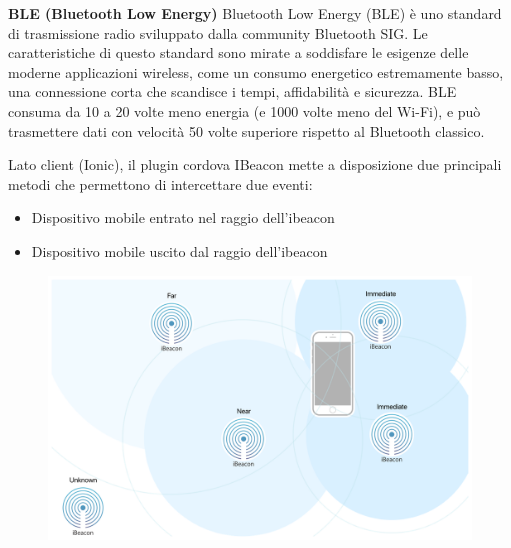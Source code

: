 \textbf{BLE (Bluetooth Low Energy)}
Bluetooth Low Energy (BLE) è uno standard di trasmissione radio sviluppato dalla community 
Bluetooth SIG. Le caratteristiche di questo standard sono mirate a soddisfare le esigenze
delle moderne applicazioni wireless, come un consumo energetico estremamente basso, una
connessione corta che scandisce i tempi, affidabilità e sicurezza. 
BLE consuma da 10 a 20 volte meno energia (e 1000 volte meno del Wi-Fi), e può trasmettere
dati con velocità 50 volte superiore rispetto al Bluetooth classico. 

Lato client (Ionic), il plugin cordova IBeacon mette a disposizione due principali metodi
che permettono di intercettare due eventi:

\begin{itemize}
    \item Dispositivo mobile entrato nel raggio dell'ibeacon
    \item Dispositivo mobile uscito dal raggio dell'ibeacon
\end{itemize}

\begin{figure}[H]
    \centering  
    \includegraphics[scale=0.3]{img/cap2/beacon-proximity}
\end{figure}


